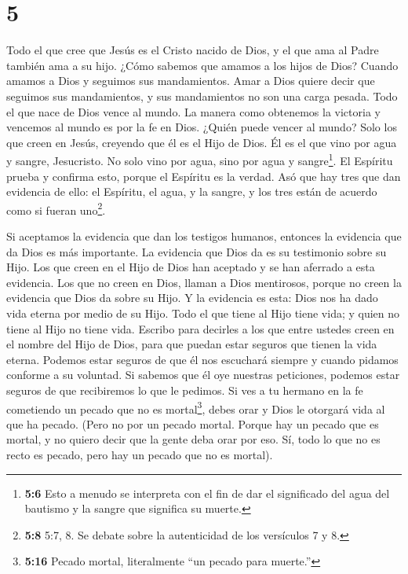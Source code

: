 \hypertarget{section-4}{%
\section{5}\label{section-4}}

 Todo el que cree que Jesús es el Cristo nacido de Dios, y
el que ama al Padre también ama a su hijo.  ¿Cómo sabemos
que amamos a los hijos de Dios? Cuando amamos a Dios y seguimos sus
mandamientos.  Amar a Dios quiere decir que seguimos sus
mandamientos, y sus mandamientos no son una carga pesada. 
Todo el que nace de Dios vence al mundo. La manera como obtenemos la
victoria y vencemos al mundo es por la fe en Dios.  ¿Quién
puede vencer al mundo? Solo los que creen en Jesús, creyendo que él es
el Hijo de Dios.  Él es el que vino por agua y sangre,
Jesucristo. No solo vino por agua, sino por agua y sangre\footnote{\textbf{5:6}
  Esto a menudo se interpreta con el fin de dar el significado del agua
  del bautismo y la sangre que significa su muerte.}. El Espíritu prueba
y confirma esto, porque el Espíritu es la verdad.  Asó que
hay tres que dan evidencia de ello:  el Espíritu, el agua, y
la sangre, y los tres están de acuerdo como si fueran uno\footnote{\textbf{5:8}
  5:7, 8. Se debate sobre la autenticidad de los versículos 7 y 8.}.

 Si aceptamos la evidencia que dan los testigos humanos,
entonces la evidencia que da Dios es más importante. La evidencia que
Dios da es su testimonio sobre su Hijo.  Los que creen en
el Hijo de Dios han aceptado y se han aferrado a esta evidencia. Los que
no creen en Dios, llaman a Dios mentirosos, porque no creen la evidencia
que Dios da sobre su Hijo.  Y la evidencia es esta: Dios
nos ha dado vida eterna por medio de su Hijo.  Todo el que
tiene al Hijo tiene vida; y quien no tiene al Hijo no tiene vida.
 Escribo para decirles a los que entre ustedes creen en el
nombre del Hijo de Dios, para que puedan estar seguros que tienen la
vida eterna.  Podemos estar seguros de que él nos escuchará
siempre y cuando pidamos conforme a su voluntad.  Si
sabemos que él oye nuestras peticiones, podemos estar seguros de que
recibiremos lo que le pedimos.  Si ves a tu hermano en la
fe cometiendo un pecado que no es mortal\footnote{\textbf{5:16} Pecado
  mortal, literalmente ``un pecado para muerte.''}, debes orar y Dios le
otorgará vida al que ha pecado. (Pero no por un pecado mortal. Porque
hay un pecado que es mortal, y no quiero decir que la gente deba orar
por eso.  Sí, todo lo que no es recto es pecado, pero hay
un pecado que no es mortal).

